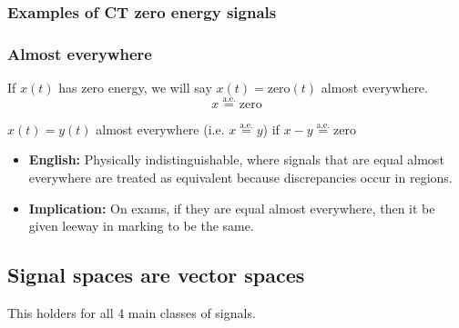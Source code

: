     \subsubsection{Examples of CT zero energy signals}
    \begin{example}
    \end{example}

    \subsubsection{Almost everywhere}
    \begin{definition}
        If $x(t)$ has zero energy, we will say $x(t) = \text{zero}(t)$ almost everywhere.
        \begin{equation}
            x \overset{\text{a.e.}}{=} \text{zero}
        \end{equation}

        $x(t) = y(t)$ almost everywhere (i.e.  $x \overset{\text{a.e.}}{=} y$) if $x-y \overset{\text{a.e.}}{=} \text{zero}$
        \begin{itemize}
            \item \textbf{English:} Physically indistinguishable, where signals that are equal almost everywhere are treated as equivalent because discrepancies occur in regions.
            \item \textbf{Implication:} On exams, if they are equal almost everywhere, then it be given leeway in marking to be the same. 
        \end{itemize}
    \end{definition}

\subsection{Signal spaces are vector spaces}
    This holders for all 4 main classes of signals. 

